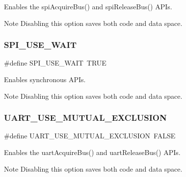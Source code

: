 Enables the {\ttfamily spi\+Acquire\+Bus()} and {\ttfamily spi\+Release\+Bus()} A\+P\+Is. 

\begin{DoxyNote}{Note}
Disabling this option saves both code and data space. 
\end{DoxyNote}
\hypertarget{group__HAL__CONF_ga0c9ab1488423fa10a22f506c6e74b563}{}\label{group__HAL__CONF_ga0c9ab1488423fa10a22f506c6e74b563} 
\subsubsection{\texorpdfstring{S\+P\+I\+\_\+\+U\+S\+E\+\_\+\+W\+A\+IT}{SPI\_USE\_WAIT}}
{\footnotesize\ttfamily \#define S\+P\+I\+\_\+\+U\+S\+E\+\_\+\+W\+A\+IT~T\+R\+UE}



Enables synchronous A\+P\+Is. 

\begin{DoxyNote}{Note}
Disabling this option saves both code and data space. 
\end{DoxyNote}
\hypertarget{group__HAL__CONF_gae689e57cf792af401c324de566038687}{}\label{group__HAL__CONF_gae689e57cf792af401c324de566038687} 
\subsubsection{\texorpdfstring{U\+A\+R\+T\+\_\+\+U\+S\+E\+\_\+\+M\+U\+T\+U\+A\+L\+\_\+\+E\+X\+C\+L\+U\+S\+I\+ON}{UART\_USE\_MUTUAL\_EXCLUSION}}
{\footnotesize\ttfamily \#define U\+A\+R\+T\+\_\+\+U\+S\+E\+\_\+\+M\+U\+T\+U\+A\+L\+\_\+\+E\+X\+C\+L\+U\+S\+I\+ON~F\+A\+L\+SE}



Enables the {\ttfamily uart\+Acquire\+Bus()} and {\ttfamily uart\+Release\+Bus()} A\+P\+Is. 

\begin{DoxyNote}{Note}
Disabling this option saves both code and data space. 
\end{DoxyNote}
\hypertarget{group__HAL__CONF_ga3ccbb19b26b53ba0a8e40cb6b8650114}{}\label{group__HAL__CONF_ga3ccbb19b26b53ba0a8e40cb6b8650114} 
